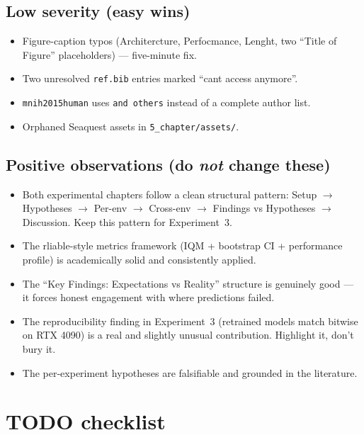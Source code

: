 \documentclass[11pt,a4paper]{article}
\newcommand{\fileline}[1]{\texttt{\small #1}}
\begin{document}
\subsection*{Low severity (easy wins)}

\begin{itemize}[leftmargin=*]
  \item Figure-caption typos (Architercture, Perfocmance, Lenght, two
  ``Title of Figure'' placeholders) --- five-minute fix.
  \item Two unresolved \fileline{ref.bib} entries marked
  ``cant access anymore''.
  \item \fileline{mnih2015human} uses \texttt{and others} instead of a
  complete author list.
  \item Orphaned Seaquest assets in \fileline{5\_chapter/assets/}.
\end{itemize}

\subsection*{Positive observations (do \emph{not} change these)}

\begin{itemize}[leftmargin=*]
  \item Both experimental chapters follow a clean structural pattern:
  Setup $\to$ Hypotheses $\to$ Per-env $\to$ Cross-env $\to$ Findings
  vs Hypotheses $\to$ Discussion. Keep this pattern for Experiment~3.
  \item The rliable-style metrics framework (IQM + bootstrap CI +
  performance profile) is academically solid and consistently applied.
  \item The ``Key Findings: Expectations vs Reality'' structure is
  genuinely good --- it forces honest engagement with where predictions
  failed.
  \item The reproducibility finding in Experiment~3 (retrained models
  match bitwise on RTX 4090) is a real and slightly unusual contribution.
  Highlight it, don't bury it.
  \item The per-experiment hypotheses are falsifiable and grounded in
  the literature.
\end{itemize}

\section{TODO checklist}\label{sec:todo}
\end{document}

